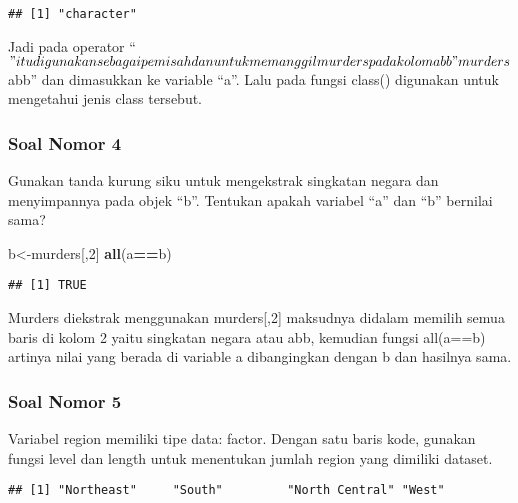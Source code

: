 \documentclass[
]{article}
\newenvironment{Shaded}{\begin{snugshade}}{\end{snugshade}}
\newcommand{\DecValTok}[1]{\textcolor[rgb]{0.00,0.00,0.81}{#1}}
\newcommand{\KeywordTok}[1]{\textcolor[rgb]{0.13,0.29,0.53}{\textbf{#1}}}
\newcommand{\NormalTok}[1]{#1}
\newcommand{\OperatorTok}[1]{\textcolor[rgb]{0.81,0.36,0.00}{\textbf{#1}}}
\newcommand{\StringTok}[1]{\textcolor[rgb]{0.31,0.60,0.02}{#1}}
\begin{document}
\begin{verbatim}
## [1] "character"
\end{verbatim}

Jadi pada operator
``\(" itu digunakan sebagai pemisah dan untuk memanggil murders pada kolom abb "murders\)abb''
dan dimasukkan ke variable ``a''. Lalu pada fungsi class() digunakan
untuk mengetahui jenis class tersebut.

\hypertarget{soal-nomor-4}{%
\subsubsection{Soal Nomor 4}\label{soal-nomor-4}}

Gunakan tanda kurung siku untuk mengekstrak singkatan negara dan
menyimpannya pada objek ``b''. Tentukan apakah variabel ``a'' dan ``b''
bernilai sama?

\begin{Shaded}
\begin{Highlighting}[]
\NormalTok{b<-murders[,}\DecValTok{2}\NormalTok{]}
\KeywordTok{all}\NormalTok{(a}\OperatorTok{==}\NormalTok{b)}
\end{Highlighting}
\end{Shaded}

\begin{verbatim}
## [1] TRUE
\end{verbatim}

Murders diekstrak menggunakan murders{[},2{]} maksudnya didalam memilih
semua baris di kolom 2 yaitu singkatan negara atau abb, kemudian fungsi
all(a==b) artinya nilai yang berada di variable a dibangingkan dengan b
dan hasilnya sama.

\hypertarget{soal-nomor-5}{%
\subsubsection{Soal Nomor 5}\label{soal-nomor-5}}

Variabel region memiliki tipe data: factor. Dengan satu baris kode,
gunakan fungsi level dan length untuk menentukan jumlah region yang
dimiliki dataset.

\begin{Shaded}
\end{Shaded}

\begin{verbatim}
## [1] "Northeast"     "South"         "North Central" "West"
\end{verbatim}
\end{document}
